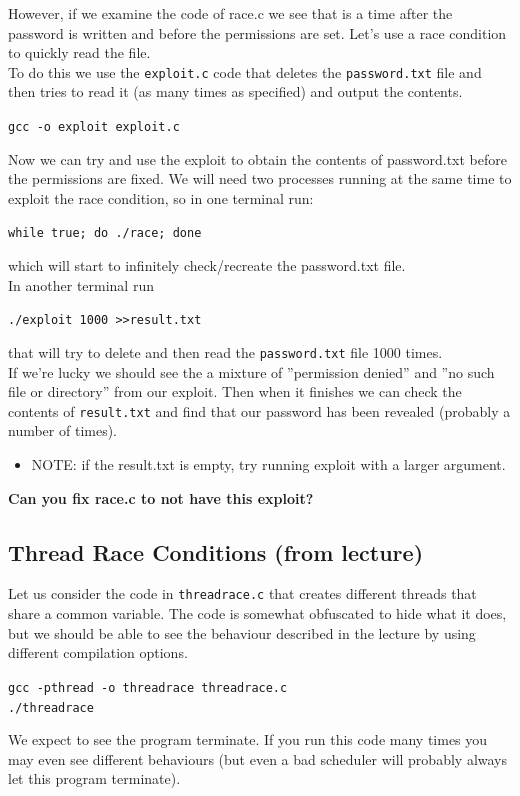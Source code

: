 \documentclass{article}
\begin{document}
\noindent However, if we examine the code of race.c we see that is a time after
the password is written and before the permissions are set. Let’s use a race
condition to quickly read the file.\\

\noindent To do this we use the \lstinline{exploit.c} code that deletes the \lstinline{password.txt} file and
then tries to read it (as many times as specified) and output the contents.
\begin{center}
    \lstinline{gcc -o exploit exploit.c}
\end{center}

\noindent Now we can try and use the exploit to obtain the contents of password.txt
before the permissions are fixed. We will need two processes running at the
same time to exploit the race condition, so in one terminal run:
\begin{center}
    \lstinline{while true; do ./race; done}
\end{center}

\noindent which will start to infinitely check/recreate the password.txt file.\\

\noindent In another terminal run
\begin{center}
    \lstinline{./exploit 1000 >>result.txt}
\end{center}
\noindent that will try to delete and then read the \lstinline{password.txt} file 1000 times.\\

\noindent If we’re lucky we should see the a mixture of ”permission denied” and
”no such file or directory” from our exploit. Then when it finishes we can
check the contents of \lstinline{result.txt} and find that our password has been revealed (probably a number of times).
\begin{itemize}
    \item NOTE: if the result.txt is empty, try running exploit with a larger argument.
\end{itemize}
\textbf{Can you fix race.c to not have this exploit?}
\newpage 

\subsection{Thread Race Conditions (from lecture)}
\noindent Let us consider the code in \lstinline{threadrace.c} that creates different threads that share a common variable. The code is somewhat obfuscated to hide what it
does, but we should be able to see the behaviour described in the lecture by
using different compilation options.
\begin{center}
    \lstinline{gcc -pthread -o threadrace threadrace.c}\\
    \lstinline{./threadrace}
\end{center}
\noindent We expect to see the program terminate. If you run this code many times you
may even see different behaviours (but even a bad scheduler will probably
always let this program terminate).\\
\end{document}
